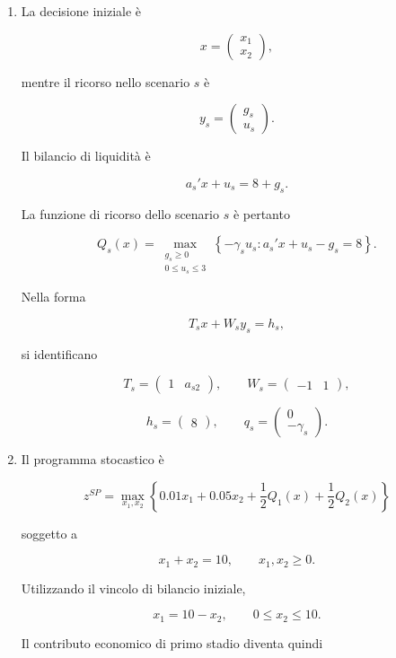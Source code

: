 \begin{enumerate}

\item La decisione iniziale \`e

\[
x=
\begin{pmatrix}
x_1\\
x_2
\end{pmatrix},
\]

mentre il ricorso nello scenario $s$ \`e

\[
y_s=
\begin{pmatrix}
g_s\\
u_s
\end{pmatrix}.
\]

Il bilancio di liquidit\`a \`e

\[
a_s'x+u_s=8+g_s.
\]

La funzione di ricorso dello scenario $s$
\`e pertanto

\[
Q_s(x)
=
\max_{\substack{g_s\geq0\\0\leq u_s\leq3}}
\left\{
-\gamma_su_s:
a_s'x+u_s-g_s=8
\right\}.
\]

Nella forma

\[
T_sx+W_sy_s=h_s,
\]

si identificano

\[
T_s=
\begin{pmatrix}
1&a_{s2}
\end{pmatrix},
\qquad
W_s=
\begin{pmatrix}
-1&1
\end{pmatrix},
\]

\[
h_s=
\begin{pmatrix}
8
\end{pmatrix},
\qquad
q_s=
\begin{pmatrix}
0\\
-\gamma_s
\end{pmatrix}.
\]

\item Il programma stocastico \`e

\[
z^{SP}
=
\max_{x_1,x_2}
\left\{
0.01x_1+0.05x_2
+\frac12 Q_1(x)
+\frac12 Q_2(x)
\right\}
\]

soggetto a

\[
x_1+x_2=10,
\qquad
x_1,x_2\geq0.
\]

Utilizzando il vincolo di bilancio iniziale,

\[
x_1=10-x_2,
\qquad
0\leq x_2\leq10.
\]

Il contributo economico di primo stadio
diventa quindi


\end{enumerate}
